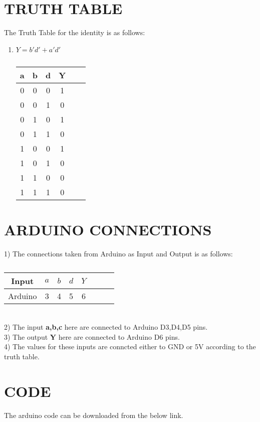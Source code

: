 \documentclass[a4paper,11pt,twocolumn]{article}
\begin{document}
\section{TRUTH TABLE}
The Truth Table for the identity is as follows:
\begin{enumerate}[label=\textbf{(\Alph*})]
	\item \textbf{ $ Y=b'd'+a'd' $} \\
\bigskip
\begin{table}[ht!]
	\centering
\begin{tabular}{ |c |c |c |c |c |c |} 
\hline 
\newline 
	\textbf{a} & \textbf{b} & \textbf{d} & \textbf{Y} \\ 
\hline  
	0 & 0 & 0 &1 \\   
	0 & 0 & 1 &0 \\  
	0 & 1 & 0 &1 \\  
	0 & 1 & 1 &0 \\  
	1 & 0 & 0 &1 \\  
	1 & 0 & 1 &0 \\  
	1 & 1 & 0 &0 \\  
	1 & 1 & 1 &0 \\  
\hline 
\end{tabular}
	\caption{}
\end{table}
\bigskip
\bigskip


\end{enumerate}
\section{ARDUINO CONNECTIONS}

1) The connections taken from Arduino as Input and Output is as follows:
\begin{table}[ht!] 
    \centering 
    \begin{tabular}{|c|c|c|c|c|c|c|c|} 
    \hline 
       Input & $a$&$b$&$d$&$Y$\\ 
       \hline 
    Arduino & 3&4&5&6\\ 
    \hline 
    \end{tabular} 
    \caption{} 
\end{table} 
\\
2) The  input \textbf{a,b,c} here are connected to Arduino D3,D4,D5 pins.\\
3) The  output \textbf{Y} here are connected to Arduino D6 pins.\\
4) The values for these inputs are conncted either to GND or 5V according to the truth table.\\
\section{CODE}
\paragraph{}
	The arduino code can be downloaded from the below link.
\begin{center} 
\end{center}
\end{document}
